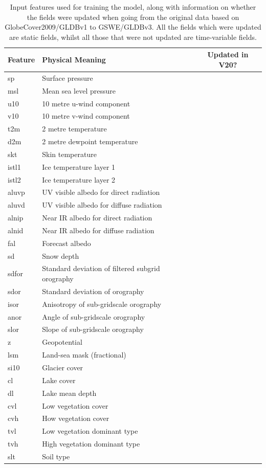 \documentclass[twocolumn]{article}
\begin{document}
\begin{table}[t]
	\centering
	\begin{tabular}{llc}
		Feature              & Physical Meaning & Updated in V20?  \\
		\hline
		sp & Surface pressure &  \\
		msl & Mean sea level pressure &  \\
		u10 & 10 metre u-wind component &  \\
		v10 & 10 metre v-wind component &  \\
		t2m & 2 metre temperature &  \\
		d2m & 2 metre dewpoint temperature  &  \\
		skt & Skin temperature &  \\
		istl1 & Ice temperature layer 1 &  \\
		istl2 & Ice temperature layer 2 &  \\
		aluvp & UV visible albedo for direct radiation &  \\
		aluvd & UV visible albedo for diffuse radiation &  \\
		alnip & Near IR albedo for direct radiation &  \\
		alnid & Near IR albedo for diffuse radiation &  \\
		fal & Forecast albedo &  \\
		sd & Snow depth &  \\
		sdfor & Standard deviation of filtered subgrid orography &  \checkmark \\
		sdor & Standard deviation of orography &  \checkmark \\
		isor & Anisotropy of sub-gridscale orography &  \checkmark \\
		anor & Angle of sub-gridscale orography & \checkmark  \\
		slor & Slope of sub-gridscale orography &  \checkmark \\
		z & Geopotential &  \checkmark \\          
		lsm & Land-sea mask (fractional) &  \checkmark \\   
		si10 & Glacier cover &  \checkmark \\               
		cl & Lake cover &   \checkmark \\
		dl & Lake mean depth & \checkmark  \\        
		cvl & Low vegetation cover &   \checkmark\\
		cvh & How vegetation cover &   \checkmark\\
		tvl & Low vegetation dominant type&   \checkmark\\
		tvh & High vegetation  dominant type&  \checkmark \\
		slt & Soil type & \checkmark  \\
		
		
		\hline
	\end{tabular}
	\caption{Input features used for training the model, along with information on whether the fields were updated when going from the original data based on GlobeCover2009/GLDBv1 to GSWE/GLDBv3. All the fields which were updated are static fields, whilst all those that were not updated are time-variable fields.}
	\label{tab:1}
\end{table}
\end{document}
